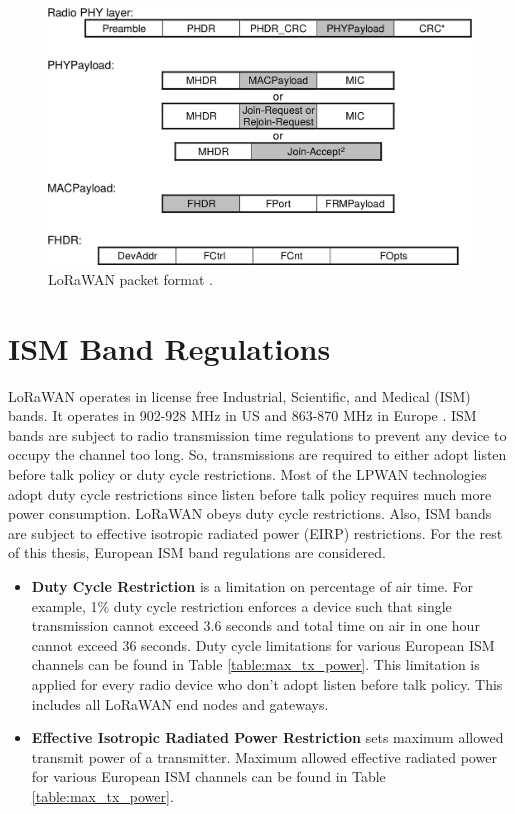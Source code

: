 \begin{figure}
\centering
\includegraphics[width=\linewidth]{fig/lorawan_mac.png}
\vspace*{4mm}
\caption{LoRaWAN packet format \cite{lorawan.specification}.}
\label{fig:lorawan_mac}
\end{figure}


\section{ISM Band Regulations}
LoRaWAN operates in license free Industrial, Scientific, and Medical (ISM) bands. It operates in 902-928 MHz in US and 863-870 MHz in Europe \cite{lorawan.regional.parameters}. ISM bands are subject to radio transmission time regulations to prevent any device to occupy the channel too long. So, transmissions are required to either adopt listen before talk policy or duty cycle restrictions. Most of the LPWAN technologies adopt duty cycle restrictions since listen before talk policy requires much more power consumption. LoRaWAN obeys duty cycle restrictions. Also, ISM bands are subject to effective isotropic radiated power (EIRP) restrictions. For the rest of this thesis, European ISM band regulations are considered.

\begin{itemize}
  \item \textbf{Duty Cycle Restriction} is a limitation on percentage of air time. For example, 1\% duty cycle restriction enforces a device such that single transmission cannot exceed 3.6 seconds and total time on air in one hour cannot exceed 36 seconds. Duty cycle limitations for various European ISM channels can be found in Table \ref{table:max_tx_power}. This limitation is applied for every radio device who don't adopt listen before talk policy. This includes all LoRaWAN end nodes and gateways.
  \item \textbf{Effective Isotropic Radiated Power Restriction} sets maximum allowed transmit power of a transmitter. Maximum allowed effective radiated power for various European ISM channels can be found in Table \ref{table:max_tx_power}.
\end{itemize}

